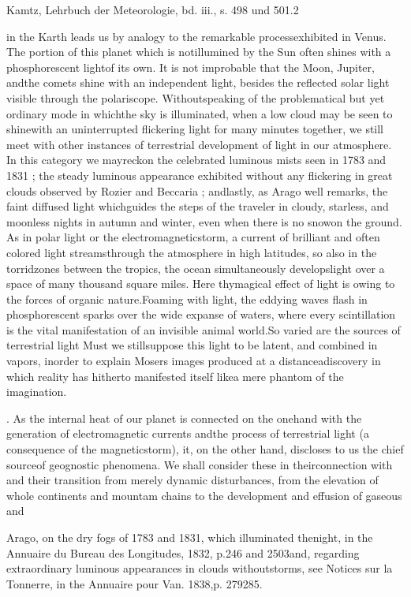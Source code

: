  Kamtz, Lehrbuch der Meteorologie, bd. iii., s. 498 und 501.2

in the Karth leads us by analogy to the remarkable processexhibited in Venus. The portion of this planet which is notillumined by the Sun often shines with a phosphorescent lightof its own. It is not improbable that the Moon, Jupiter, andthe comets shine with an independent light, besides the reflected solar light visible through the polariscope. Withoutspeaking of the problematical but yet ordinary mode in whichthe sky is illuminated, when a low cloud may be seen to shinewith an uninterrupted flickering light for many minutes together, we still meet with other instances of terrestrial development of light in our atmosphere. In this category we mayreckon the celebrated luminous mists seen in 1783 and 1831 ; the steady luminous appearance exhibited without any flickering in great clouds observed by Rozier and Beccaria ; andlastly, as Arago well remarks, the faint diffused light whichguides the steps of the traveler in cloudy, starless, and moonless nights in autumn and winter, even when there is no snowon the ground. As in polar light or the electromagneticstorm, a current of brilliant and often colored light streamsthrough the atmosphere in high latitudes, so also in the torridzones between the tropics, the ocean simultaneously developslight over a space of many thousand square miles. Here thymagical effect of light is owing to the forces of organic nature.Foaming with light, the eddying waves flash in phosphorescent sparks over the wide expanse of waters, where every scintillation is the vital manifestation of an invisible animal world.So varied are the sources of terrestrial light Must we stillsuppose this light to be latent, and combined in vapors, inorder to explain Mosers images produced at a distanceadiscovery in which reality has hitherto manifested itself likea mere phantom of the imagination. 

. As the internal heat of our planet is connected on the onehand with the generation of electromagnetic currents andthe process of terrestrial light (a consequence of the magneticstorm), it, on the other hand, discloses to us the chief sourceof geognostic phenomena. We shall consider these in theirconnection with and their transition from merely dynamic disturbances, from the elevation of whole continents and mountam chains to the development and effusion of gaseous and

 Arago, on the dry fogs of 1783 and 1831, which illuminated thenight, in the Annuaire du Bureau des Longitudes, 1832, p.246 and 2503and, regarding extraordinary luminous appearances in clouds withoutstorms, see Notices sur la Tonnerre, in the Annuaire pour Van. 1838,p. 279285.

